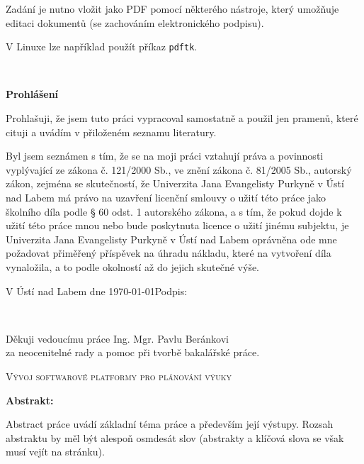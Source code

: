 \documentclass[male,czech,api_bc]{kitheses}
\newcommand{\nazevcz}{Vývoj softwarové platformy pro plánování výuky}        %
\newcommand{\vedouciDAT}{Ing. Mgr. Pavlu Beránkovi}
\begin{document}
Zadání je nutno vložit jako PDF pomocí některého nástroje, který umožňuje editaci dokumentů (se zachováním
elektronického podpisu).

V Linuxe lze například použít příkaz \texttt{pdftk}.

\clearpage
\thispagestyle{empty}
\afterpage{\nopagecolor}
~
\clearpage

\thispagestyle{empty} 
{\bfseries Prohlášení}

\vspace{0.5cm}
Prohlašuji, že jsem tuto  práci vypracoval
samostatně a použil
jen pramenů, které cituji a uvádím v přiloženém seznamu literatury.

\vspace{0.5em}

Byl jsem seznámen 
s tím, že se na moji práci vztahují práva a povinnosti vyplývající ze
zákona č. 121/2000 Sb., ve znění zákona č. 81/2005 Sb., autorský zákon, zejména se
skutečností, že Univerzita Jana Evangelisty Purkyně v Ústí nad Labem má právo na uzavření
licenční smlouvy o užití této práce jako školního díla podle § 60 odst. 1 autorského zákona, a
s tím, že pokud dojde k užití této práce mnou nebo bude poskytnuta licence o užití jinému
subjektu, je Univerzita Jana Evangelisty Purkyně v Ústí nad Labem oprávněna ode mne
požadovat přiměřený příspěvek na úhradu nákladu, které na vytvoření díla vynaložila, a to
podle okolností až do jejich skutečné výše.

\vspace{2em}

V Ústí nad Labem dne \today   \hfill Podpis: \makebox[4cm][s]{\dotfill}

\cleardoublepage
\thispagestyle{empty}
~
\vfill

\begin{flushright}
    Děkuji vedoucímu práce {\vedouciDAT}\\ 
    za neocenitelné rady a pomoc při tvorbě bakalářské práce.
\end{flushright}

\cleardoublepage

\textsc{\nazevcz}

\textbf{Abstrakt:}

Abstract práce uvádí základní téma práce a především její výstupy. Rozsah abstraktu by měl být alespoň osmdesát slov (abstrakty a klíčová slova se však musí vejít na stránku).
\end{document}

